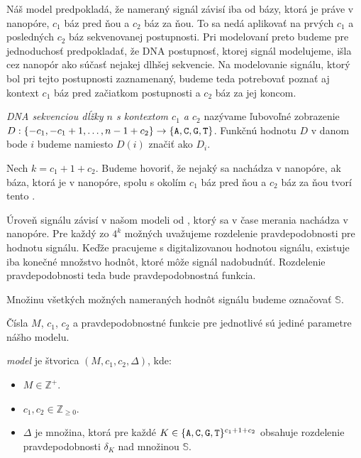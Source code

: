 Náš model predpokladá, že nameraný signál závisí iba od bázy, ktorá je práve v nanopóre, $c_1$
báz pred ňou a $c_2$ báz za ňou. To sa nedá aplikovať na prvých $c_1$ a posledných $c_2$ báz 
sekvenovanej postupnosti. Pri modelovaní preto budeme pre jednoduchosť predpokladať, že DNA postupnosť, 
ktorej signál modelujeme, išla cez nanopór ako súčasť nejakej dlhšej sekvencie. Na modelovanie
signálu, ktorý bol pri tejto postupnosti zaznamenaný, budeme teda potrebovať poznať aj 
kontext $c_1$ báz pred začiatkom postupnosti a $c_2$ báz za jej koncom.

\begin{definicia}

\emph{DNA sekvenciou dĺžky $n$ s kontextom $c_1$ a $c_2$} nazývame ľubovoľné zobrazenie 
$D: \{-c_1, -c_1+1, \dots, n-1+c_2\} \rightarrow \{\texttt{A}, \texttt{C}, \texttt{G}, \texttt{T}\}$. Funkčnú hodnotu $D$ v danom bode $i$
budeme namiesto $D(i)$ značiť ako $D_i$.

\end{definicia}

Nech $k = c_1 + 1 + c_2$. Budeme hovoriť, že nejaký \kmer{} sa nachádza v nanopóre, ak báza, 
ktorá je v nanopóre, spolu s okolím $c_1$ báz pred ňou a $c_2$ báz za ňou tvorí tento \kmer{}.

Úroveň signálu závisí v našom modeli od , ktorý sa v čase merania nachádza v nanopóre.
Pre každý zo $4^k$ možných  uvažujeme rozdelenie 
pravdepodobnosti pre hodnotu signálu.
Keďže pracujeme s digitalizovanou hodnotou signálu, existuje iba konečné množstvo hodnôt, ktoré
môže signál nadobudnúť. Rozdelenie pravdepodobnosti teda bude pravdepodobnostná funkcia.

\begin{definicia}

Množinu všetkých možných nameraných hodnôt signálu budeme označovať $\mathbb{S}$.

\end{definicia}

Čísla $M$, $c_1$, $c_2$ a pravdepodobnostné funkcie pre jednotlivé  sú jediné
parametre nášho modelu.

\begin{definicia}

\emph{ model} je štvorica $(M, c_1, c_2, \Delta)$, kde:

\begin{itemize}
\item $M \in \mathbb{Z}^+$.
\item $c_1, c_2 \in \mathbb{Z}_{\geq 0}$.
\item $\Delta$ je množina, ktorá pre každé $K \in \{\texttt{A}, \texttt{C}, \texttt{G}, \texttt{T}\}^{c_1 + 1 + c_2}$ obsahuje rozdelenie pravdepodobnosti
$\delta_K$ nad množinou $\mathbb{S}$.
\end{itemize}
\end{definicia}


